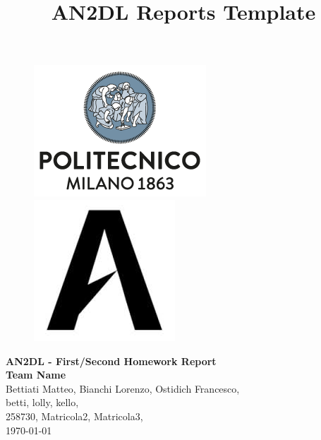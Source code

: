 \documentclass[11pt]{article}
\title{AN2DL Reports Template}
\begin{document}
    
    \begin{figure}[H]
        \raggedright
        \includegraphics[scale=0.4]{polimi.png} \hfill \includegraphics[scale=0.3]{airlab.jpeg}
    \end{figure}
    
    \vspace{5mm}
    
    \begin{center}
        {\Large \textbf{AN2DL - First/Second Homework Report}}\\
        \vspace{2mm}
        {\Large \textbf{Team Name}}\\
        \vspace{2mm}
        {\large Bettiati Matteo,}
        {\large Bianchi Lorenzo,}
        {\large Ostidich Francesco,}\\
        \vspace{2mm}
        {betti,}
        {lolly,}
        {kello,}\\
        \vspace{2mm}
        {258730,}
        {Matricola2,}
        {Matricola3,}\\
        \vspace{5mm}
        \today
    \end{center}    
    \vspace{5mm}
\end{document}
